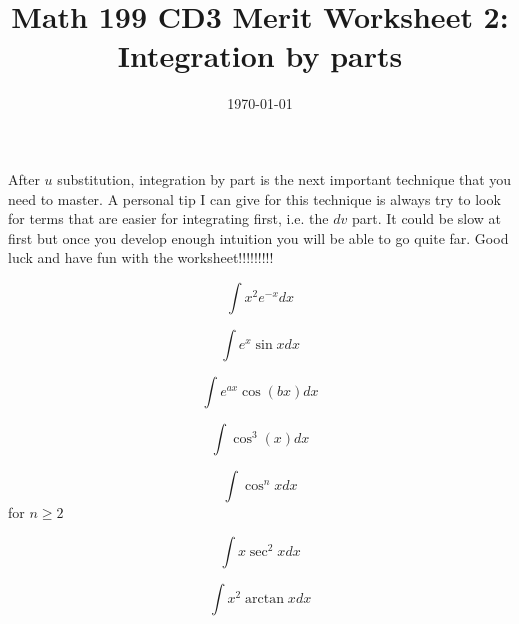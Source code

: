 
\usepackage{fullpage,amsmath,amssymb,amsthm}

\newcommand{\D}{\displaystyle}

\title{Math 199 CD3 Merit Worksheet 2: Integration by parts }
\date{\today}




\maketitle
After $u$ substitution, integration by part is the next important technique that you need to master. A personal tip I can give for this technique is always try to look for terms that are easier for integrating first, i.e. the $dv$ part. It could be slow at first but once you develop enough intuition you will be able to go quite far. Good luck and have fun with the worksheet!!!!!!!!! 
\be
	\item $$\int x^2e^{-x}dx $$
	\vskip 3cm
	\item $$\int e^x\sin x dx$$
	\vskip 3cm 
	\item $$\int e^{ax}\cos(bx) dx$$
	\vskip 3cm
	\item $$
	\int\cos^3(x)dx$$
	\vskip 3cm
	\item $$\int \cos^nxdx$$
	for $n\geq 2$
	\vskip 3cm
	\item $$\int x\sec^2xdx$$
	\vskip 3cm
	\item $$\int x^2\arctan xdx$$

\ee

